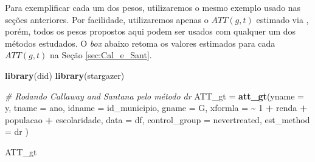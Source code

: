 \documentclass[portugues]{article}
\newenvironment{Shaded}{\begin{snugshade}}{\end{snugshade}}
\newcommand{\AttributeTok}[1]{\textcolor[rgb]{0.13,0.29,0.53}{#1}}
\newcommand{\CommentTok}[1]{\textcolor[rgb]{0.56,0.35,0.01}{\textit{#1}}}
\newcommand{\DecValTok}[1]{\textcolor[rgb]{0.00,0.00,0.81}{#1}}
\newcommand{\FunctionTok}[1]{\textcolor[rgb]{0.13,0.29,0.53}{\textbf{#1}}}
\newcommand{\NormalTok}[1]{#1}
\newcommand{\OtherTok}[1]{\textcolor[rgb]{0.56,0.35,0.01}{#1}}
\newcommand{\SpecialCharTok}[1]{\textcolor[rgb]{0.81,0.36,0.00}{\textbf{#1}}}
\newcommand{\StringTok}[1]{\textcolor[rgb]{0.31,0.60,0.02}{#1}}
\begin{document}
Para exemplificar cada um dos pesos, utilizaremos o mesmo exemplo usado nas seções anteriores. Por facilidade, utilizaremos apenas o $ATT(g,t)$ estimado via \cite{callaway2021difference}, porém, todos os pesos propostos aqui podem ser usados com qualquer um dos métodos estudados. O \textit{box} abaixo retoma os valores estimados para cada $ATT(g,t)$ na Seção \ref{sec:Cal_e_Sant}.

\begin{box_code}

\begin{Shaded}
\begin{Highlighting}[]
\FunctionTok{library}\NormalTok{(did)}
\FunctionTok{library}\NormalTok{(stargazer)}

\CommentTok{\# Rodando Callaway and Sant\textquotesingle{}ana pelo método \textquotesingle{}dr\textquotesingle{}}
\NormalTok{ATT\_gt }\OtherTok{=} \FunctionTok{att\_gt}\NormalTok{(}\AttributeTok{yname =} \StringTok{\textquotesingle{}y\textquotesingle{}}\NormalTok{, }
                \AttributeTok{tname =} \StringTok{\textquotesingle{}ano\textquotesingle{}}\NormalTok{, }
                \AttributeTok{idname =} \StringTok{\textquotesingle{}id\_municipio\textquotesingle{}}\NormalTok{, }
                \AttributeTok{gname =} \StringTok{\textquotesingle{}G\textquotesingle{}}\NormalTok{, }
                \AttributeTok{xformla =} \SpecialCharTok{\textasciitilde{}} \DecValTok{1} \SpecialCharTok{+}\NormalTok{ renda }\SpecialCharTok{+}\NormalTok{ populacao }
                \hspace{10mm}\SpecialCharTok{+}\NormalTok{ escolaridade,}
                \AttributeTok{data =}\NormalTok{ df, }
                \AttributeTok{control\_group =} \StringTok{\textquotesingle{}nevertreated\textquotesingle{}}\NormalTok{, }
                \AttributeTok{est\_method =} \StringTok{\textquotesingle{}dr\textquotesingle{}}
\NormalTok{                )}

\NormalTok{ATT\_gt}
\end{Highlighting}
\end{Shaded}


\end{box_code}
\end{document}
